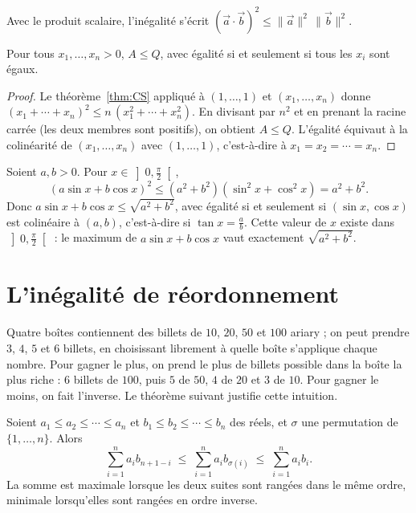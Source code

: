 \documentclass[11pt]{article}
\begin{document}
Avec le produit scalaire, l'inégalité s'écrit
$\left(\vec a \cdot \vec b\right)^2 \leqslant \|\vec a\|^2\,\|\vec b\|^2$.

\begin{proposition}\label{cor:QM}
Pour tous $x_1, \ldots, x_n > 0$, $A \leqslant Q$, avec égalité si et seulement
si tous les $x_i$ sont égaux.
\end{proposition}

\begin{proof}
Le théorème~\ref{thm:CS} appliqué à $(1, \ldots, 1)$ et $(x_1, \ldots, x_n)$
donne $(x_1 + \cdots + x_n)^2 \leqslant n\,(x_1^2 + \cdots + x_n^2)$. En
divisant par $n^2$ et en prenant la racine carrée (les deux membres sont
positifs), on obtient $A \leqslant Q$. L'égalité équivaut à la colinéarité
de $(x_1, \ldots, x_n)$ avec $(1, \ldots, 1)$, c'est-à-dire à
$x_1 = x_2 = \cdots = x_n$.
\end{proof}

\begin{exemple}
Soient $a, b > 0$. Pour $x \in \left]0, \frac\pi2\right[$,
\[
(a \sin x + b \cos x)^2 \leqslant (a^2 + b^2)(\sin^2 x + \cos^2 x) = a^2 + b^2 .
\]
Donc $a\sin x + b\cos x \leqslant \sqrt{a^2 + b^2}$, avec égalité si et
seulement si $(\sin x, \cos x)$ est colinéaire à $(a, b)$, c'est-à-dire
si $\tan x = \frac ab$. Cette valeur de $x$ existe dans $\left]0, \frac\pi2\right[$ :
le maximum de $a\sin x + b\cos x$ vaut exactement $\sqrt{a^2 + b^2}$.
\end{exemple}

\section{L'inégalité de réordonnement}\label{sec:reordonnement}

Quatre boîtes contiennent des billets de $10$, $20$, $50$ et $100$ ariary ;
on peut prendre $3$, $4$, $5$ et $6$ billets, en choisissant librement à
quelle boîte s'applique chaque nombre. Pour gagner le plus, on prend le plus
de billets possible dans la boîte la plus riche : $6$ billets de $100$, puis
$5$ de $50$, $4$ de $20$ et $3$ de $10$. Pour gagner le moins, on fait
l'inverse. Le théorème suivant justifie cette intuition.

\begin{theoreme}\label{thm:reord}
Soient $a_1 \leqslant a_2 \leqslant \cdots \leqslant a_n$ et
$b_1 \leqslant b_2 \leqslant \cdots \leqslant b_n$ des réels, et $\sigma$ une
permutation de $\{1, \ldots, n\}$. Alors
\[
\sum_{i=1}^{n} a_i b_{n+1-i} \;\leqslant\; \sum_{i=1}^{n} a_i b_{\sigma(i)}
\;\leqslant\; \sum_{i=1}^{n} a_i b_i .
\]
La somme est maximale lorsque les deux suites sont rangées dans le même
ordre, minimale lorsqu'elles sont rangées en ordre inverse.
\end{theoreme}
\end{document}
